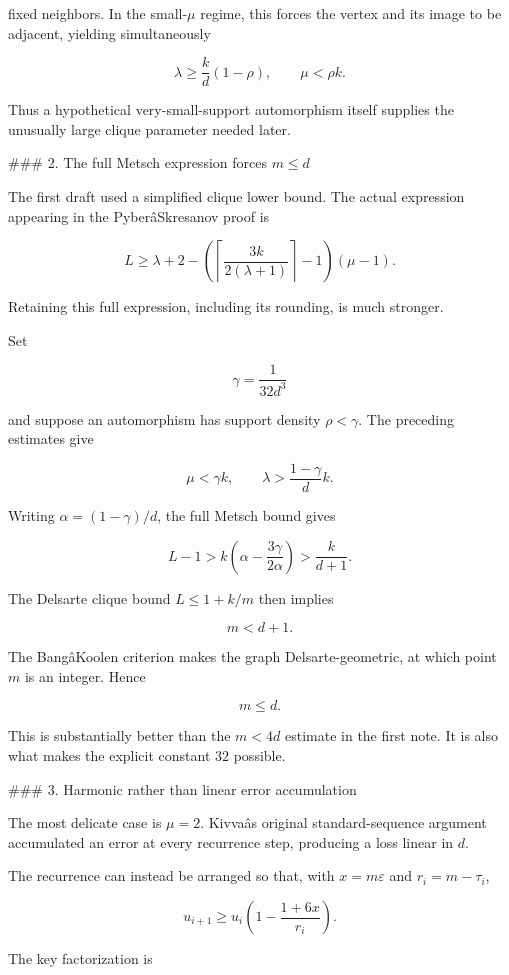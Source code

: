 fixed neighbors. In the small-\(\mu\) regime, this forces the vertex and its image to be adjacent, yielding simultaneously

\[
\lambda\ge\frac{k}{d}(1-\rho),
\qquad
\mu<\rho k.
\]

Thus a hypothetical very-small-support automorphism itself supplies the unusually large clique parameter needed later.

### 2. The full Metsch expression forces \(m\le d\)

The first draft used a simplified clique lower bound. The actual expression appearing in the PyberâSkresanov proof is

\[
L\ge
\lambda+2-
\left(
\left\lceil\frac{3k}{2(\lambda+1)}\right\rceil-1
\right)(\mu-1).
\]

Retaining this full expression, including its rounding, is much stronger.

Set

\[
\gamma=\frac1{32d^3}
\]

and suppose an automorphism has support density \(\rho<\gamma\). The preceding estimates give

\[
\mu<\gamma k,
\qquad
\lambda>\frac{1-\gamma}{d}k.
\]

Writing \(\alpha=(1-\gamma)/d\), the full Metsch bound gives

\[
L-1>
k\left(\alpha-\frac{3\gamma}{2\alpha}\right)
>
\frac{k}{d+1}.
\]

The Delsarte clique bound \(L\le1+k/m\) then implies

\[
m<d+1.
\]

The BangâKoolen criterion makes the graph Delsarte-geometric, at which point \(m\) is an integer. Hence

\[
\boxed{m\le d.}
\]

This is substantially better than the \(m<4d\) estimate in the first note. It is also what makes the explicit constant \(32\) possible.

### 3. Harmonic rather than linear error accumulation

The most delicate case is \(\mu=2\). Kivvaâs original standard-sequence argument accumulated an error at every recurrence step, producing a loss linear in \(d\).

The recurrence can instead be arranged so that, with \(x=m\varepsilon\) and \(r_i=m-\tau_i\),

\[
u_{i+1}
\ge
u_i\left(1-\frac{1+6x}{r_i}\right).
\]

The key factorization is

